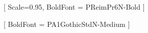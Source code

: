 

\usepackage[no-math,deluxe,expert]{luatexja-preset}





\setmainfont{Libertinus Serif}
\setsansfont{Libertinus Sans}
\setmonofont{inconsolata}





[
  Scale=0.95,
  BoldFont = {PReimPr6N-Bold}
]

[
  BoldFont = {PA1GothicStdN-Medium}
]

